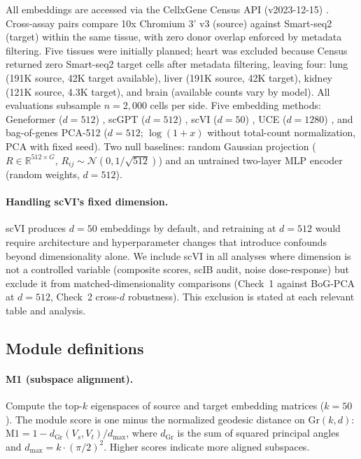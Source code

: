 \documentclass[10pt,letterpaper]{article}
\newcommand{\Gr}{\mathrm{Gr}}
\begin{document}
All embeddings are accessed via the CellxGene Census API (v2023-12-15) \citep{abdulla2025cellxgene}. Cross-assay pairs compare 10x Chromium 3' v3 (source) against Smart-seq2 (target) within the same tissue, with zero donor overlap enforced by metadata filtering. Five tissues were initially planned; heart was excluded because Census returned zero Smart-seq2 target cells after metadata filtering, leaving four: lung (191K source, 42K target available), liver (191K source, 42K target), kidney (121K source, 4.3K target), and brain (available counts vary by model). All evaluations subsample $n = 2{,}000$ cells per side. Five embedding methods: Geneformer ($d = 512$) \citep{theodoris2023geneformer}, scGPT ($d = 512$) \citep{cui2024scgpt}, scVI ($d = 50$) \citep{lopez2018scvi}, UCE ($d = 1280$) \citep{rosen2026uce}, and bag-of-genes PCA-512 ($d = 512$; $\log(1 + x)$ without total-count normalization, PCA with fixed seed). Two null baselines: random Gaussian projection ($R \in \mathbb{R}^{512 \times G}$, $R_{ij} \sim \mathcal{N}(0, 1/\sqrt{512})$) and an untrained two-layer MLP encoder (random weights, $d = 512$).

\paragraph{Handling scVI's fixed dimension.} scVI produces $d = 50$ embeddings by default, and retraining at $d = 512$ would require architecture and hyperparameter changes that introduce confounds beyond dimensionality alone. We include scVI in all analyses where dimension is not a controlled variable (composite scores, scIB audit, noise dose-response) but exclude it from matched-dimensionality comparisons (Check~1 against BoG-PCA at $d = 512$, Check~2 cross-$d$ robustness). This exclusion is stated at each relevant table and analysis.

\subsection{Module definitions}

\paragraph{M1 (subspace alignment).} Compute the top-$k$ eigenspaces of source and target embedding matrices ($k = 50$). The module score is one minus the normalized geodesic distance on $\Gr(k, d)$: $\text{M1} = 1 - d_{\Gr}(V_s, V_t) / d_{\max}$, where $d_{\Gr}$ is the sum of squared principal angles and $d_{\max} = k \cdot (\pi/2)^2$. Higher scores indicate more aligned subspaces.
\end{document}
